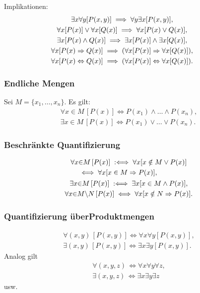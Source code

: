 Implikationen:
\begin{gather}
\hspace{-2em}\exists x\forall y[P(x,y)]\implies \forall y\exists x[P(x,y)],\\
\hspace{-2em}\forall x[P(x)]\lor\forall x[Q(x)]\implies\forall x[P(x)\lor Q(x)],\\
\hspace{-2em}\exists x[P(x)\land Q(x)]\implies
  \exists x[P(x)]\land \exists x[Q(x)],\\
\hspace{-2em}\forall x[P(x)\Rightarrow Q(x)]\implies
  (\forall x[P(x)]\Rightarrow\forall x[Q(x)]),\\
\hspace{-2em}\forall x[P(x)\Leftrightarrow Q(x)]\implies
  (\forall x[P(x)]\Leftrightarrow\forall x[Q(x)]).
\end{gather}

\subsubsection{Endliche Mengen}
Sei $M=\{x_1,\ldots,x_n\}$. Es gilt:
\begin{gather}
\forall x{\in}M\,[P(x)]\iff P(x_1)\land\ldots\land P(x_n),\\
\exists x{\in}M\,[P(x)]\iff P(x_1)\lor\ldots\lor P(x_n).
\end{gather}

\subsubsection{Beschränkte Quantifizierung}
\begin{gather}
\begin{split}
& \forall x{\in}M\,[P(x)]\;:\Longleftrightarrow\;\forall x[x\notin M\lor P(x)]\\
& \quad\iff\forall x[x\in M\Rightarrow P(x)],
\end{split}\\
\exists x{\in}M\,[P(x)]\;:\Longleftrightarrow\;\exists x[x\in M\land P(x)],\\
\forall x{\in}M{\setminus}N\,[P(x)]\iff \forall x[x\notin N\Rightarrow P(x)].
\end{gather}

\subsubsection[Quantifizierung über Produktmengen]%
{Quantifizierung über\newline Produktmengen}
\begin{gather}
\forall(x,y)\,[P(x,y)]\iff \forall x\forall y[P(x,y)],\\
\exists(x,y)\,[P(x,y)]\iff \exists x\exists y[P(x,y)].
\end{gather}
Analog gilt
\begin{gather}
\forall(x,y,z)\,\iff \forall x\forall y\forall z,\\
\exists(x,y,z)\,\iff \exists x\exists y\exists z
\end{gather}
usw.

